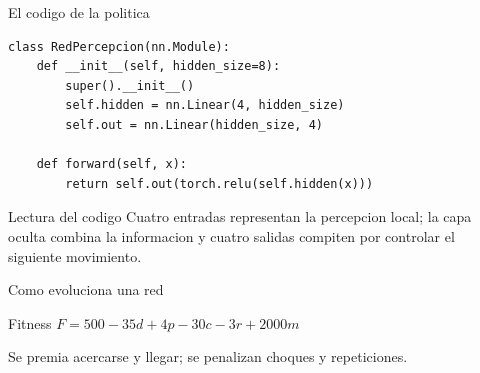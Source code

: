 \documentclass[aspectratio=169,11pt]{beamer}
\begin{document}
\begin{frame}[fragile]{El codigo de la politica}
\begin{lstlisting}[style=python]
class RedPercepcion(nn.Module):
    def __init__(self, hidden_size=8):
        super().__init__()
        self.hidden = nn.Linear(4, hidden_size)
        self.out = nn.Linear(hidden_size, 4)

    def forward(self, x):
        return self.out(torch.relu(self.hidden(x)))
\end{lstlisting}
  \begin{block}{Lectura del codigo}
    Cuatro entradas representan la percepcion local; la capa oculta combina la informacion y cuatro salidas compiten por controlar el siguiente movimiento.
  \end{block}
\end{frame}

\begin{frame}{Como evoluciona una red}
  \begin{center}
  \end{center}
  \vspace{0.35cm}
  \begin{block}{Fitness}
    \centering
    $F = 500 - 35d + 4p - 30c - 3r + 2000m$
  \end{block}
  \begin{center}
    Se premia acercarse y llegar; se penalizan choques y repeticiones.
  \end{center}
\end{frame}
\end{document}
